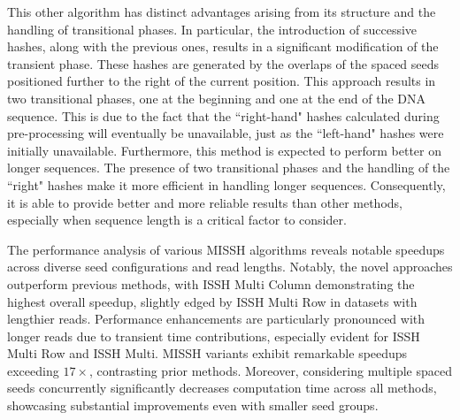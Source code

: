 This other algorithm has distinct advantages arising from its structure and the handling of transitional phases. In particular, the introduction of successive hashes, along with the previous ones, results in a significant modification of the transient phase. These hashes are generated by the overlaps of the spaced seeds positioned further to the right of the current position. This approach results in two transitional phases, one at the beginning and one at the end of the DNA sequence. This is due to the fact that the “right-hand" hashes calculated during pre-processing will eventually be unavailable, just as the “left-hand" hashes were initially unavailable. Furthermore, this method is expected to perform better on longer sequences. The presence of two transitional phases and the handling of the “right" hashes make it more efficient in handling longer sequences. Consequently, it is able to provide better and more reliable results than other methods, especially when sequence length is a critical factor to consider.

The performance analysis of various \acs{MISSH} algorithms reveals notable speedups across diverse seed configurations and read lengths. Notably, the novel approaches outperform previous methods, with ISSH Multi Column demonstrating the highest overall speedup, slightly edged by ISSH Multi Row in datasets with lengthier reads. Performance enhancements are particularly pronounced with longer reads due to transient time contributions, especially evident for ISSH Multi Row and ISSH Multi. \acs{MISSH} variants exhibit remarkable speedups exceeding $17\times$, contrasting prior methods. Moreover, considering multiple spaced seeds concurrently significantly decreases computation time across all methods, showcasing substantial improvements even with smaller seed groups.
